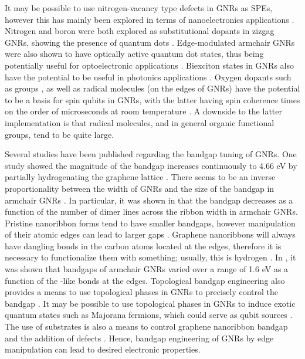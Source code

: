 \documentclass[]{article}
\begin{document}
It may be possible to use nitrogen-vacancy type defects in GNRs as SPEs, however this has mainly been explored in terms of nanoelectronics applications \cite{spin_gapless_N_doped_ZGNR}. Nitrogen and boron were both explored as substitutional dopants in zizgag GNRs, showing the presence of quantum dots \cite{B_N_doped_GNR}. Edge-modulated armchair GNRs were also shown to have optically active quantum dot states, thus being potentially useful for optoelectronic applications \cite{QD_edge_modulated_GNR}. Biexciton states in GNRs also have the potential to be useful in photonics applications \cite{exciton_annihilation_GNR}. Oxygen dopants such as  groups \cite{oxygen_functional_groups_graphene}, as well as radical molecules (on the edges of GNRs) \cite{spinning_edge_graphene} have the potential to be a basis for spin qubits in GNRs, with the latter having spin coherence times on the order of microseconds at room temperature \cite{magnetic_edge_states_coherent_manipulation_GNR}. A downside to the latter implementation is that radical molecules, and in general organic functional groups, tend to be quite large.
\newline

Several studies have been published regarding the bandgap tuning of GNRs. One study showed the magnitude of the bandgap increases continuously to 4.66 eV by partially hydrogenating the graphene lattice \cite{bandgap_tuning_hydrogenated_graphene}. There seems to be an inverse proportionality between the width of GNRs and the size of the bandgap in armchair GNRs \cite{width_depedent_bandgap_AGNR, energy_bandgap_engineering_GNR}. In particular, it was shown in \cite{energy_gaps_armchair_AGNR} that the bandgap decreases as a function of the number of dimer lines across the ribbon width in armchair GNRs. Pristine nanoribbon forms tend to have smaller bandgaps, however manipulation of their atomic edges can lead to larger gaps \cite{bandgap_engineering_GNR_edge_dihydrogenation, Edge_passivation_AGNR_bandgap_engineering}. Graphene nanoribbons will always have dangling bonds in the carbon atoms located at the edges, therefore it is necessary to functionalize them with something; usually, this is hydrogen \cite{bandgap_engineering_GNR_edge_dihydrogenation, Edge_passivation_AGNR_bandgap_engineering}. In \cite{Edge_passivation_AGNR_bandgap_engineering}, it was shown that bandgaps of armchair GNRs varied over a range of 1.6 eV as a function of the -like bonds at the edges. Topological bandgap engineering also provides a means to use topological phases in GNRs to precisely control the bandgap \cite{topological_band_engineering_GNR, engineering_topological_quantum_phases_GNR}. It may be possible to use topological phases in GNRs to induce exotic quantum states such as Majorana fermions, which could serve as qubit sources \cite{engineering_topological_quantum_phases_GNR}. The use of substrates is also a means to control graphene nanoribbon bandgap and the addition of defects \cite{synthesis_GNR_metal_oxide}. Hence, bandgap engineering of GNRs by edge manipulation can lead to desired electronic properties. 
\newline  
\end{document}
